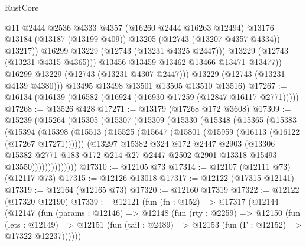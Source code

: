 \begin{lexlean}{RustCore}
\begin{coremodule}
                      @11
                      @2444
                      @2536
                      @4333
                      @4357
                      (@16260 @2444 @16263 @12494)
                      @13176
                      @13184
                      (@13187 (@13199 @409))
                      @13205
                      (@12743 (@13207 @4357 @4334))
                      @13217))
                  @16299
                  @13229
                  (@12743 (@13231 @4325 @2447)))
                @13229
                (@12743 (@13231 @4315 @4365)))
              @13456
              @13459
              @13462
              @13466
              @13471
              @13477))
          @16299
          @13229
          (@12743 (@13231 @4307 @2447)))
        @13229
        (@12743 (@13231 @4139 @4380)))
      @13495
      @13498
      @13501
      @13505
      @13510
      @13516)
@17267 := @16134 (@16139 (@16582 (@16924 (@16930 @17259 (@12847 @16117 @2771)))))
@17268 := @13526 @428
@17271 := @13179 (@17268 @172 @3608)
@17309 := @15239
    (@15264
      (@15305
        (@15307
          (@15309
            (@15330
              (@15348
                (@15365
                  (@15383
                    (@15394
                      (@15398
                        (@15513
                          (@15525
                            (@15647 (@15801 (@15959 (@16113 (@16122 (@17267 @17271))))))
                            (@13297
                              @15382
                              @324
                              @172
                              @2447
                              @2903
                              (@13306
                                @15382
                                @2771
                                @183
                                @172
                                @214
                                @27
                                @2447
                                @2502
                                @2901
                                @13318
                                @15493
                                @13550))))))))))))))
@17310 := @12105 @73
@17314 := @12107 (@12111 @73) (@12117 @73)
@17315 := @12126 @13018
@17317 := @12122 (@17315 @12141)
@17319 := @12164 (@12165 @73)
@17320 := @12160 @17319
@17322 := @12122 (@17320 @12190)
@17339 := @12121
    (fun (fn : @152) =>
    @17317
      (@12144
        (@12147
          (fun (params : @12146) =>
          @12148
            (fun (rty : @2259) =>
            @12150
              (fun (lets : @12149) =>
              @12151 (fun (tail : @2489) => @12153 (fun (Γ : @12152) => @17322 @12237))))))

\end{coremodule}
\end{lexlean}
